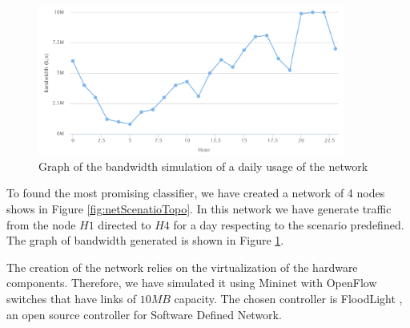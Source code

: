 \documentclass[12pt]{article}
\begin{document}
\begin{figure}[h!]
	\centering
	\includegraphics[width=0.9\textwidth]{img/networkScenario.png}
	\caption[]
	{Graph of the bandwidth simulation of a daily usage of the network}
	\label{fig:netScenarioConf}
\end{figure}


To found the most promising classifier, we have created a network of 4 nodes shows in Figure \ref{fig:netScenatioTopo}.
In this network we have generate traffic from the node $H1$ directed to $H4$ for a day respecting to the scenario predefined. The graph of bandwidth generated is shown in Figure \ref{fig:netScenarioConf}.

The creation of the network relies on the virtualization of the hardware components.
Therefore, we have simulated it using Mininet \cite{mininet} with OpenFlow \cite{openflow} switches that have links of $10MB$ capacity.
The chosen controller is FloodLight \cite{floodlight}, an open source controller for Software Defined Network.
\end{document}
